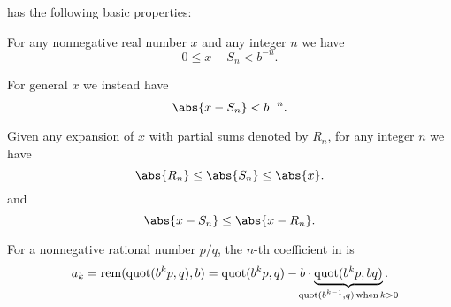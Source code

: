 \begin{proposition}\label{thm:alg:real_number_radix_expansion}
   has the following basic properties:
  \begin{thmenum}
     For any nonnegative real number \( x \) and any integer \( n \) we have
    \begin{equation}\label{eq:thm:alg:real_number_radix_expansion/estimate/nonnegative}
      0 \leq x - S_n < b^{-n}.
    \end{equation}

    For general \( x \) we instead have
    \begin{equation}\label{eq:thm:alg:real_number_radix_expansion/estimate/general}
      \abs{x - S_n} < b^{-n}.
    \end{equation}

     Given any expansion of \( x \) with partial sums denoted by \( R_n \), for any integer \( n \) we have
    \begin{equation}\label{eq:thm:alg:real_number_radix_expansion/optimal/max}
      \abs{R_n} \leq \abs{S_n} \leq \abs{x}.
    \end{equation}
    and
    \begin{equation}\label{eq:thm:alg:real_number_radix_expansion/optimal/min}
      \abs{x - S_n} \leq \abs{x - R_n}.
    \end{equation}

     For a nonnegative rational number \( p / q \), the \( n \)-th  coefficient in  is
    \begin{equation}\label{eq:thm:alg:real_number_radix_expansion/rational_coefficient}
      a_k
      =
      \rem(\quot(b^k p, q), b)
      =
      \quot(b^k p, q) - b \cdot \underbrace{\quot(b^k p, bq)}_{\mathclap{\quot(b^{k-1}, q) \T*{when} k > 0}}.
    \end{equation}
  \end{thmenum}
\end{proposition}
